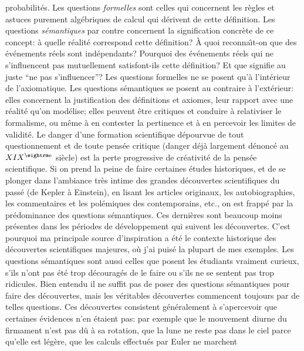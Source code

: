 probabilit\'es. Les questions {\it formelles} sont celles qui concernent 
les  r\`egles et astuces purement alg\'ebriques de calcul qui d\'erivent 
de  cette d\'efinition. Les questions {\it s\'emantiques} par contre 
concernent la signification concr\`ete de ce concept: \`a quelle  
r\'ealit\'e correspond cette d\'efinition? \`A quoi reconna\^\i t-on que 
des \'ev\'enements r\'eels sont ind\'ependants? Pourquoi des 
\'ev\'enements r\'eels qui ne s'influencent pas mutuellement 
satisfont-ils cette d\'efinition? Et que signifie au juste ``ne pas 
s'influencer''?  \medskip Les questions formelles ne se posent qu'\`a 
l'int\'erieur de l'axiomatique. Les questions s\'emantiques se posent au 
contraire \`a l'ext\'erieur: elles concernent la justification  des 
d\'efinitions et axiomes, leur rapport  avec une r\'ealit\'e qu'on 
mod\'elise; elles peuvent \^etre critiques et conduire  \`a relativiser le 
formalisme, ou m\^eme \`a en contester la pertinence et \`a en percevoir 
les limites de validit\'e.   
\medskip 
Le danger d'une formation scientifique d\'epourvue de tout 
questionnement et de toute pens\'ee critique (danger d\'ej\`a largement 
d\'enonc\'e au $XIX^{\rm e}$  si\`ecle) est la perte progressive de 
cr\'eativit\'e de la pens\'ee scientifique. Si on prend la peine de faire 
certaines \'etudes historiques, et de se plonger  dans l'ambiance tr\`es 
intime des grandes d\'ecouvertes scientifiques du pass\'e (de Kepler  
\`a Einstein), en lisant les articles originaux, les auto\-bio\-graphies,  
les commentaires et les pol\'emiques des contemporains, etc., on est 
frapp\'e par la pr\'edominance des questions s\'emantiques. Ces  
derni\`eres sont beaucoup moins pr\'esentes dans les 
p\'eriodes de d\'eveloppement qui suivent les d\'ecouvertes.  C'est 
pourquoi ma  principale source d'inspiration a \'et\'e le contexte 
historique des d\'ecouvertes scientifiques majeures, o\`u j'ai puis\'e la 
plupart de mes exemples. Les questions s\'emantiques sont aussi celles 
que posent les \'etudiants vraiment curieux, s'ils n'ont pas \'et\'e trop 
d\'ecourag\'es de le faire ou s'ils ne se sentent pas trop ridicules.  
\medskip 
Bien entendu il ne suffit pas de poser des questions s\'emantiques pour 
faire des d\'ecouvertes, mais les  v\'eritables d\'ecouvertes 
commencent toujours par de telles questions.  Ces d\'ecouvertes 
consistent g\'en\'eralement \`a  s'apercevoir que  certaines \'evidences  
n'en \'etaient pas: par exemple que   le mouvement diurne du firmament 
n'est pas d\^u \`a sa rotation, que la lune ne reste pas dans le ciel parce 
qu'elle est l\'eg\`ere, que les calculs effectu\'es par Euler ne marchent 
